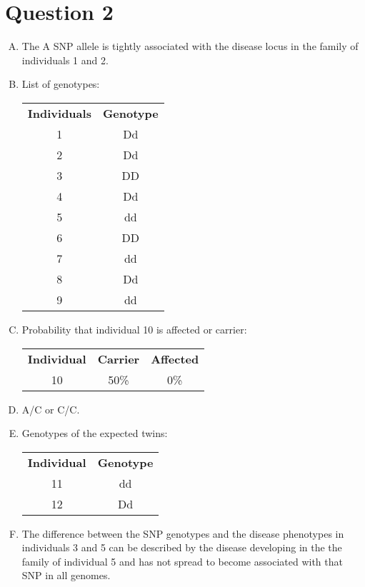 \documentclass{article}
\begin{document}
\section*{Question 2}

\begin{enumerate}[A.]
    \item The A SNP allele is tightly associated with the disease locus in the family of individuals 1 and 2.
    
    \item List of genotypes:
    \begin{center}\begin{tabular}{c c}
        \textbf{Individuals} & \textbf{Genotype} \\
        1 & Dd \\
        2 & Dd \\
        3 & DD \\
        4 & Dd \\
        5 & dd \\
        6 & DD \\
        7 & dd \\
        8 & Dd \\
        9 & dd
    \end{tabular}\end{center}
    
    \item Probability that individual 10 is affected or carrier:
    \begin{center}
        \begin{tabular}{c c c}
            \textbf{Individual} & \textbf{Carrier} & \textbf{Affected} \\
            10 & 50\% & 0\%
        \end{tabular}
    \end{center}
    
    \item A/C or C/C.
    
    \item Genotypes of the expected twins:
    \begin{center}
        \begin{tabular}{c c}
            \textbf{Individual} & \textbf{Genotype} \\
            11 & dd \\
            12 & Dd \\
        \end{tabular}
    \end{center}
    
    \item The difference between the SNP genotypes and the disease phenotypes in individuals 3 and 5 can be described by the disease developing in the the family of individual 5 and has not spread to become associated with that SNP in all genomes.
    
\end{enumerate}
\end{document}
